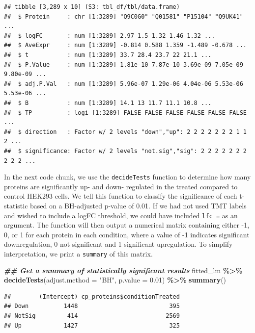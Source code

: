 \documentclass[9pt,a4paper,]{extarticle}
\newenvironment{Shaded}{\begin{snugshade}}{\end{snugshade}}
\newcommand{\AttributeTok}[1]{\textcolor[rgb]{0.13,0.29,0.53}{#1}}
\newcommand{\DocumentationTok}[1]{\textcolor[rgb]{0.56,0.35,0.01}{\textbf{\textit{#1}}}}
\newcommand{\FloatTok}[1]{\textcolor[rgb]{0.00,0.00,0.81}{#1}}
\newcommand{\FunctionTok}[1]{\textcolor[rgb]{0.13,0.29,0.53}{\textbf{#1}}}
\newcommand{\NormalTok}[1]{#1}
\newcommand{\SpecialCharTok}[1]{\textcolor[rgb]{0.81,0.36,0.00}{\textbf{#1}}}
\newcommand{\StringTok}[1]{\textcolor[rgb]{0.31,0.60,0.02}{#1}}
\begin{document}
\begin{verbatim}
## tibble [3,289 x 10] (S3: tbl_df/tbl/data.frame)
##  $ Protein     : chr [1:3289] "Q9C0G0" "Q01581" "P15104" "Q9UK41" ...
##  $ logFC       : num [1:3289] 2.97 1.5 1.32 1.46 1.32 ...
##  $ AveExpr     : num [1:3289] -0.814 0.588 1.359 -1.489 -0.678 ...
##  $ t           : num [1:3289] 33.7 28.4 23.7 22 21.1 ...
##  $ P.Value     : num [1:3289] 1.81e-10 7.87e-10 3.69e-09 7.05e-09 9.80e-09 ...
##  $ adj.P.Val   : num [1:3289] 5.96e-07 1.29e-06 4.04e-06 5.53e-06 5.53e-06 ...
##  $ B           : num [1:3289] 14.1 13 11.7 11.1 10.8 ...
##  $ TP          : logi [1:3289] FALSE FALSE FALSE FALSE FALSE FALSE ...
##  $ direction   : Factor w/ 2 levels "down","up": 2 2 2 2 2 2 2 1 1 2 ...
##  $ significance: Factor w/ 2 levels "not.sig","sig": 2 2 2 2 2 2 2 2 2 2 ...
\end{verbatim}

In the next code chunk, we use the \texttt{decideTests} function to determine how many
proteins are significantly up- and down- regulated in the treated compared to control
HEK293 cells. We tell this function to classify the significance of each
t-statistic based on a BH-adjusted p-value of 0.01. If we had not used TMT
labels and wished to include a logFC threshold, we could have included \texttt{lfc\ =}
as an argument. The function will then output a numerical matrix containing
either -1, 0, or 1 for each protein in each condition, where a value of -1
indicates significant downregulation, 0 not significant and 1 significant
upregulation. To simplify interpretation, we print a \texttt{summary} of this matrix.

\begin{Shaded}
\begin{Highlighting}[]
\DocumentationTok{\#\# Get a summary of statistically significant results}
\NormalTok{fitted\_lm }\SpecialCharTok{\%\textgreater{}\%}
  \FunctionTok{decideTests}\NormalTok{(}\AttributeTok{adjust.method =} \StringTok{"BH"}\NormalTok{,}
              \AttributeTok{p.value =} \FloatTok{0.01}\NormalTok{) }\SpecialCharTok{\%\textgreater{}\%}
  \FunctionTok{summary}\NormalTok{()}
\end{Highlighting}
\end{Shaded}

\begin{verbatim}
##        (Intercept) cp_proteins$conditionTreated
## Down          1448                          395
## NotSig         414                         2569
## Up            1427                          325
\end{verbatim}
\end{document}
